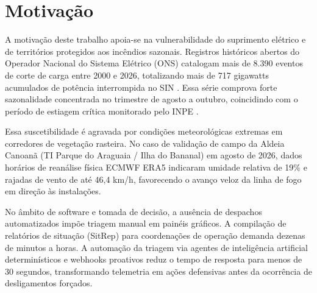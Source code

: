 \section{Motivação}
\label{sc:motivacao}

A motivação deste trabalho apoia-se na vulnerabilidade do suprimento elétrico e de territórios protegidos aos incêndios sazonais. Registros históricos abertos do Operador Nacional do Sistema Elétrico (ONS) catalogam mais de 8.390 eventos de corte de carga entre 2000 e 2026, totalizando mais de 717 gigawatts acumulados de potência interrompida no SIN \cite{ons2026dadosabertos}. Essa série comprova forte sazonalidade concentrada no trimestre de agosto a outubro, coincidindo com o período de estiagem crítica monitorado pelo INPE \cite{inpe2025bdqueimadas}.

Essa suscetibilidade é agravada por condições meteorológicas extremas em corredores de vegetação rasteira. No caso de validação de campo da Aldeia Canoanã (TI Parque do Araguaia / Ilha do Bananal) em agosto de 2026, dados horários de reanálise física ECMWF ERA5 indicaram umidade relativa de 19\% e rajadas de vento de até 46,4 km/h, favorecendo o avanço veloz da linha de fogo em direção às instalações.

No âmbito de software e tomada de decisão, a ausência de despachos automatizados impõe triagem manual em painéis gráficos. A compilação de relatórios de situação (SitRep) para coordenações de operação demanda dezenas de minutos a horas. A automação da triagem via agentes de inteligência artificial determinísticos e webhooks proativos reduz o tempo de resposta para menos de 30 segundos, transformando telemetria em ações defensivas antes da ocorrência de desligamentos forçados.
